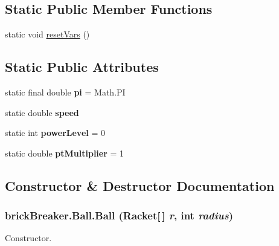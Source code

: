 \subsection*{Static Public Member Functions}
\begin{DoxyCompactItemize}
\item 
static void \hyperlink{classbrick_breaker_1_1_ball_ad43ce78383f0415e608cb247e5df9ecd}{resetVars} ()
\end{DoxyCompactItemize}
\subsection*{Static Public Attributes}
\begin{DoxyCompactItemize}
\item 
\hypertarget{classbrick_breaker_1_1_ball_a982ccc918368e8e543cd60c79906b23b}{
static final double {\bfseries pi} = Math.PI}
\label{classbrick_breaker_1_1_ball_a982ccc918368e8e543cd60c79906b23b}

\item 
\hypertarget{classbrick_breaker_1_1_ball_a823ecce6d62f6f51d6295e10a02ecb96}{
static double {\bfseries speed}}
\label{classbrick_breaker_1_1_ball_a823ecce6d62f6f51d6295e10a02ecb96}

\item 
\hypertarget{classbrick_breaker_1_1_ball_a9dac0bf349181dcee6b23afc37651064}{
static int {\bfseries powerLevel} = 0}
\label{classbrick_breaker_1_1_ball_a9dac0bf349181dcee6b23afc37651064}

\item 
\hypertarget{classbrick_breaker_1_1_ball_a9bad3add0bff004075b750e2f7cf35f4}{
static double {\bfseries ptMultiplier} = 1}
\label{classbrick_breaker_1_1_ball_a9bad3add0bff004075b750e2f7cf35f4}

\end{DoxyCompactItemize}


\subsection{Constructor \& Destructor Documentation}
\hypertarget{classbrick_breaker_1_1_ball_acb18370d945b133d9c3a3d87beca7e4c}{
\subsubsection[{Ball}]{\setlength{\rightskip}{0pt plus 5cm}brickBreaker.Ball.Ball ({\bf Racket}\mbox{[}$\,$\mbox{]} {\em r}, \/  int {\em radius})}}
\label{classbrick_breaker_1_1_ball_acb18370d945b133d9c3a3d87beca7e4c}
Constructor.


